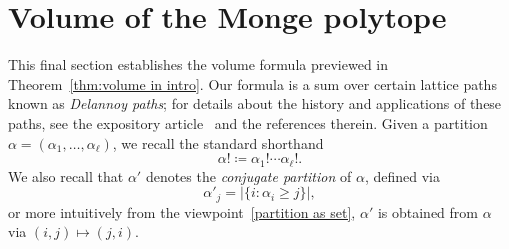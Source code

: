 \documentclass[noamsfonts,10pt]{amsart}
\newcommand{\al}{\alpha}
\newcommand{\1}{\mathbf{1}}
\theoremstyle{plain}
\theoremstyle{definition}
\numberwithin{equation}{section}
\begin{document}
\section{Volume of the Monge polytope}
\label{sec:main results}

This final section establishes the volume formula previewed in Theorem~\ref{thm:volume in intro}.
Our formula is a sum over certain lattice paths known as \emph{Delannoy paths};
for details about the history and applications of these paths, see the expository article~\cite{BanderierSchwer} and the references therein.
Given a partition $\al = (\al_1, \ldots, \al_\ell)$, we recall the standard shorthand
\[
    \al! \coloneqq \al_1! \cdots \al_\ell!.
\]
We also recall that $\al'$ denotes the \emph{conjugate partition} of $\al$, defined via
\[
    \al'_j = \left| \{ i : \al_i \geq j \} \right|,
\]
or more intuitively from the viewpoint~\eqref{partition as set}, $\al'$ is obtained from $\al$ via $(i,j) \mapsto (j,i)$.
\end{document}
